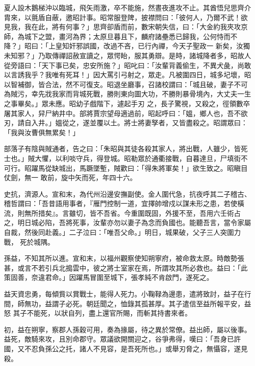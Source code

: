 \begin{pinyinscope}
 夏人設木鵝梯沖以臨城，飛矢雨激，卒不能施，然晝夜進攻不止。其酋悟兒思齊介胄來，以氈盾自蔽，邀昭計事。昭常服登陴，披襟問曰：「彼何人，乃爾不武！欲見我，我在此，將有何事？」思齊卻盾而前，數宋朝失信，曰：「大金約我夾攻京師，為城下之盟，畫河為界；太原旦暮且下，麟府諸壘悉已歸我，公何恃而不降？」昭曰：「上皇知奸邪誤國，改過不吝，已行內禪，今天子聖政一
 新矣，汝獨未知邪？」乃取傳禪詔赦宣讀之，眾愕眙，服其勇辯。是時，諸城降者多，昭故人從旁語曰：「天下事已矣，忠安所施？」昭叱曰：「汝輩背義偷生，不異犬彘，尚敢以言誘我乎？我唯有死耳！」因大罵引弓射之，眾走。凡被圍四日，城多圮壞，昭以智補御，皆合法，然不可復支。昭退坐廳事，召諸校謂曰：「城且破，妻子不可為賊污，幸先戕我家而背城死戰，勝則東向圖大功，不勝則暴骨境內，大丈夫一生之事畢矣。」眾未應。昭幼子戲階下，遽起手刃
 之，長子驚視，又殺之，徑領數卒屠其家人，舁尸納井中。部將賈宗望母適過前，昭起呼曰：「媼，鄉人也，吾不欲刃，請自入井。」媼從之，遂並覆以土。將士將妻孥者，又皆盡殺之。昭謂眾曰：「我與汝曹俱無累矣！」



 部落子有陰與賊通者，告之曰：「朱昭與其徒各殺其家人，將出戰，人雖少，皆死士也。」賊大懼，以利啖守兵，得登城。昭勒眾於通衢接戰，自暮達旦，尸填街不可行。昭躍馬從缺城出，馬蹶墜塹，賊歡曰：「得朱將軍矣！」欲生致之。昭瞋目仗劍，無一
 敢前，旋中矢而死，年四十六。



 史抗，濟源人。宣和末，為代州沿邊安撫副使。金人圍代急，抗夜呼其二子稽古、稽哲謂曰：「吾昔語用事者，『雁門控制一道，宜擇帥增戍以謀未形之患，若使橫流，則無所措矣』。言雖切，皆不吾省。今重圍既固，外援不至，吾用六壬術占之，明日城必陷，吾將死事，汝輩亦勿以妻子為念而負國也。能聽吾言，當令家屬自裁，然後同赴義。」二子泣曰：「唯吾父命。」明日，城果破，父子三人突圍力戰，
 死於城隅。



 孫益，不知其所以進。宣和末，以福州觀察使知朔寧府，被命救太原。時敵勢張甚，或言不若引兵北搗雲中，彼之將士室家在焉，所謂攻其所必救也。益曰：「此策固善，奈違君命。」因躍馬冒圍至城下，張孝純不肯啟門，遂死之。



 益天資忠勇，每傾貲以賞戰士，能得人死力。小鞠䩮為邊患，遣將致討，益子在行間，師無功，益謂子必死。朝廷聞之，恤錄其孤甚厚。其子遣信至益所報平安，益怒
 其子不能死，以狀自列，盡上還官所賜，而斬其持書來者。



 初，益在朔寧，察郡人孫穀可用，奏為掾屬，待之異於常僚。益出師，屬以後事。益死，敵騎來攻，且別命郡守。眾議欲開關迎之，谷爭弗得，嘆曰：「吾身已許國，又不忍負孫公之托，諸人不見容，是吾死所也。」或舉刃脅之，無懾容，遂見殺。



\end{pinyinscope}